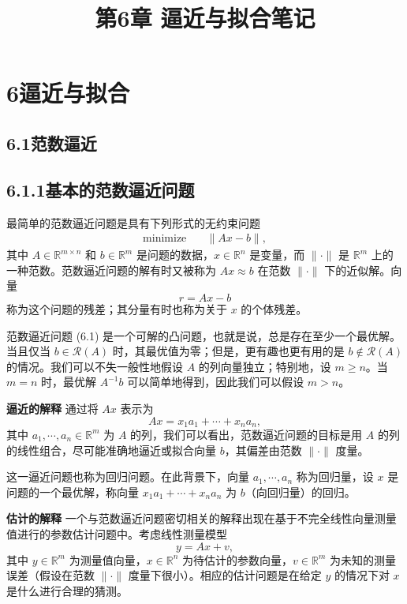 \documentclass[UTF8,12pt,a4paper,fontset=fandol]{ctexart}
\title{第6章 逼近与拟合笔记}
\author{}
\date{}
\begin{document}
\maketitle

\section*{6\quad 逼近与拟合}

\subsection*{6.1\quad 范数逼近}

\subsection*{6.1.1\quad 基本的范数逼近问题}

最简单的范数逼近问题是具有下列形式的无约束问题
\begin{equation}
\begin{aligned}
\text{minimize}\quad & \|Ax-b\|,
\end{aligned}
\tag{6.1}
\end{equation}
其中 $A\in\mathbb{R}^{m\times n}$ 和 $b\in\mathbb{R}^m$ 是问题的数据，$x\in\mathbb{R}^n$ 是变量，而 $\|\cdot\|$ 是 $\mathbb{R}^m$ 上的一种范数。范数逼近问题的解有时又被称为 $Ax\approx b$ 在范数 $\|\cdot\|$ 下的近似解。向量
\[
r=Ax-b
\]
称为这个问题的残差；其分量有时也称为关于 $x$ 的个体残差。

范数逼近问题 (6.1) 是一个可解的凸问题，也就是说，总是存在至少一个最优解。当且仅当 $b\in\mathcal{R}(A)$ 时，其最优值为零；但是，更有趣也更有用的是 $b\notin\mathcal{R}(A)$ 的情况。我们可以不失一般性地假设 $A$ 的列向量独立；特别地，设 $m\geq n$。当 $m=n$ 时，最优解 $A^{-1}b$ 可以简单地得到，因此我们可以假设 $m>n$。

\noindent\textbf{逼近的解释}\quad
通过将 $Ax$ 表示为
\[
Ax=x_1a_1+\cdots+x_na_n,
\]
其中 $a_1,\cdots,a_n\in\mathbb{R}^m$ 为 $A$ 的列，我们可以看出，范数逼近问题的目标是用 $A$ 的列的线性组合，尽可能准确地逼近或拟合向量 $b$，其偏差由范数 $\|\cdot\|$ 度量。

这一逼近问题也称为回归问题。在此背景下，向量 $a_1,\cdots,a_n$ 称为回归量，设 $x$ 是问题的一个最优解，称向量 $x_1a_1+\cdots+x_na_n$ 为 $b$（向回归量）的回归。

\noindent\textbf{估计的解释}\quad
一个与范数逼近问题密切相关的解释出现在基于不完全线性向量测量值进行的参数估计问题中。考虑线性测量模型
\[
y=Ax+v,
\]
其中 $y\in\mathbb{R}^m$ 为测量值向量，$x\in\mathbb{R}^n$ 为待估计的参数向量，$v\in\mathbb{R}^m$ 为未知的测量误差（假设在范数 $\|\cdot\|$ 度量下很小）。相应的估计问题是在给定 $y$ 的情况下对 $x$ 是什么进行合理的猜测。
\end{document}
